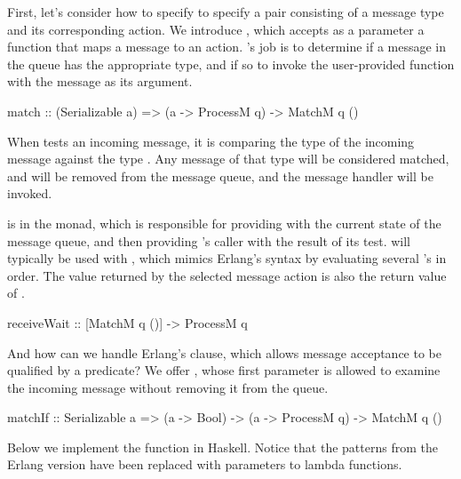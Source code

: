 \documentclass[preprint]{sigplanconf}
\begin{document}
First, let's consider how to specify to specify a pair consisting of a message type and its corresponding action. We introduce , which accepts as a parameter a function that maps a message to an action. 's job is to determine if a message in the queue has the appropriate type, and if so to invoke the user-provided function with the message as its argument.

\begin{code}
match :: (Serializable a) => (a -> ProcessM q) -> MatchM q ()
\end{code}

When  tests an incoming message, it is comparing the type of the incoming message against the type . Any message of that type will be considered matched, and will be removed from the message queue, and the message handler will be invoked.

 is in the  monad, which is responsible for providing  with the current state of the message queue, and then providing 's caller with the result of its test.  will typically be used with , which mimics Erlang's  syntax by evaluating several 's in order. The value returned by the selected message action is also the return value of .

\begin{code}
receiveWait :: [MatchM q ()] -> ProcessM q
\end{code}

And how can we handle Erlang's  clause, which allows message acceptance to be qualified by a predicate? We offer , whose first parameter is allowed to examine the incoming message without removing it from the queue.

\begin{code}
matchIf :: Serializable a => (a -> Bool) -> (a -> ProcessM q) -> MatchM q ()
\end{code}

Below we implement the  function in Haskell. Notice that the patterns from the Erlang version have been replaced with parameters to lambda functions.

\end{document}
